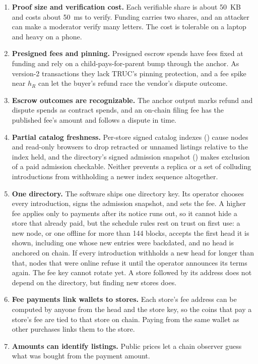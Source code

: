 \begin{enumerate}
  \item \textbf{Proof size and verification cost.} Each verifiable share is about 50~KB and costs about 50~ms to verify. Funding carries two shares, and an attacker can make a moderator verify many letters. The cost is tolerable on a laptop and heavy on a phone.
  \item \textbf{Presigned fees and pinning.} Presigned escrow spends have fees fixed at funding and rely on a child-pays-for-parent bump through the anchor. As version-2 transactions they lack TRUC's pinning protection, and a fee spike near $h_R$ can let the buyer's refund race the vendor's dispute outcome.
  \item \textbf{Escrow outcomes are recognizable.} The anchor output marks refund and dispute spends as contract spends, and an on-chain filing fee has the published fee's amount and follows a dispute in time.
  \item \textbf{Partial catalog freshness.} Per-store signed catalog indexes () cause nodes and read-only browsers to drop retracted or unnamed listings relative to the index held, and the directory's signed admission snapshot () makes exclusion of a paid admission checkable. Neither prevents a replica or a set of colluding introductions from withholding a newer index sequence altogether.
  \item \textbf{One directory.} The software ships one directory key. Its operator chooses every introduction, signs the admission snapshot, and sets the fee. A higher fee applies only to payments after its notice runs out, so it cannot hide a store that already paid, but the schedule rules rest on trust on first use: a new node, or one offline for more than 144 blocks, accepts the first head it is shown, including one whose new entries were backdated, and no head is anchored on chain. If every introduction withholds a new head for longer than that, nodes that were online refuse it until the operator announces its terms again. The fee key cannot rotate yet. A store followed by its address does not depend on the directory, but finding new stores does.
  \item \textbf{Fee payments link wallets to stores.} Each store's fee address can be computed by anyone from the head and the store key, so the coins that pay a store's fee are tied to that store on chain. Paying from the same wallet as other purchases links them to the store.
  \item \textbf{Amounts can identify listings.} Public prices let a chain observer guess what was bought from the payment amount.

\end{enumerate}
